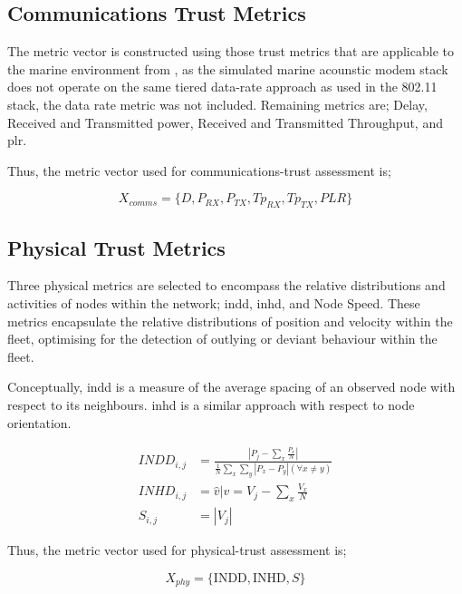 \subsection{Communications Trust Metrics}

The metric vector is constructed using those trust metrics that are applicable to the marine environment from \cite{Guo2012}, as the simulated marine acounstic modem stack does not operate on the same tiered data-rate approach as used in the 802.11 stack, the data rate metric was not included. Remaining metrics are; Delay, Received and Transmitted power, Received and Transmitted Throughput, and \gls{plr}.

Thus, the metric vector used for communications-trust assessment is;

\begin{equation}
	X_{comms}=\{D, P_{RX}, P_{TX}, Tp_{RX}, Tp_{TX}, PLR\}
	\label{eq:comms_vector}
\end{equation}

\subsection{Physical Trust Metrics}

Three physical metrics are selected to encompass the relative distributions and activities of nodes within the network; \gls{indd}, \gls{inhd}, and Node Speed. These metrics encapsulate the relative distributions of position and velocity within the fleet, optimising for the detection of outlying or deviant behaviour within the fleet.

Conceptually, \gls{indd} is a measure of the average spacing of an observed node with respect to its neighbours. \gls{inhd} is a similar approach with respect to node orientation.

\begin{align}
	INDD_{i,j} &= \frac{|P_j - \sum_x \frac{P_x}{N}|}{\frac{1}{N}\sum_x \sum_y{|P_x - P_y| (\forall x \neq y)}}\\
	INHD_{i,j} &= \hat{v} \vert v= V_j - \sum_x{\frac{V_x}{N}}\\
	S_{i,j} &= |V_j|
\end{align}

Thus, the metric vector used for physical-trust assessment is;

\begin{equation}
  X_{phy}=\{\text{INDD}, \text{INHD}, S\}
	\label{eq:phys:vector}
\end{equation}

